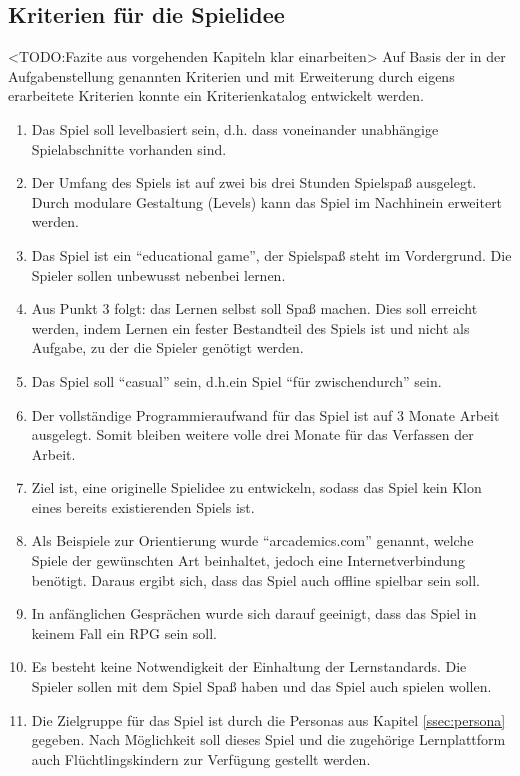 \subsection{Kriterien für die Spielidee}\label{ssec:kriterien}
	<TODO:Fazite aus vorgehenden Kapiteln klar einarbeiten>
	Auf Basis der in der Aufgabenstellung genannten Kriterien und mit Erweiterung durch eigens erarbeitete Kriterien konnte ein Kriterienkatalog entwickelt werden.
	\begin{enumerate}
		\item{Das Spiel soll levelbasiert sein, d.h. dass voneinander unabhängige Spielabschnitte vorhanden sind.}
		\item{Der Umfang des Spiels ist auf zwei bis drei Stunden Spielspaß ausgelegt. Durch modulare Gestaltung (Levels) kann das Spiel im Nachhinein erweitert werden.}
		\item{Das Spiel ist ein \enquote{educational game}, der Spielspaß steht im Vordergrund. Die Spieler sollen unbewusst nebenbei lernen.}
		\item{Aus Punkt 3 folgt: das Lernen selbst soll Spaß machen. Dies soll erreicht werden, indem Lernen ein fester Bestandteil des Spiels ist und nicht als Aufgabe, zu der die Spieler genötigt werden.}
		\item{Das Spiel soll \enquote{casual} sein, d.h.\@ ein Spiel \enquote{für zwischendurch} sein.}
		\item{Der vollständige Programmieraufwand für das Spiel ist auf 3 Monate Arbeit ausgelegt. Somit bleiben weitere volle drei Monate für das Verfassen der Arbeit.}
		\item{Ziel ist, eine originelle Spielidee zu entwickeln, sodass das Spiel kein Klon eines bereits existierenden Spiels ist.}
		\item{Als Beispiele zur Orientierung wurde \enquote{arcademics.com} genannt, welche Spiele der gewünschten Art beinhaltet, jedoch eine Internetverbindung benötigt. Daraus ergibt sich, dass das Spiel auch offline spielbar sein soll.}
		\item{In anfänglichen Gesprächen wurde sich darauf geeinigt, dass das Spiel in keinem Fall ein \gls{RPG} sein soll.}
		\item{Es besteht keine Notwendigkeit der Einhaltung der Lernstandards. Die Spieler sollen mit dem Spiel Spaß haben und das Spiel auch spielen wollen.}
		\item{Die Zielgruppe für das Spiel ist durch die Personas aus Kapitel \ref{ssec:persona} gegeben. Nach Möglichkeit soll dieses Spiel und die zugehörige Lernplattform auch Flüchtlingskindern zur Verfügung gestellt werden.}
	\end{enumerate}

